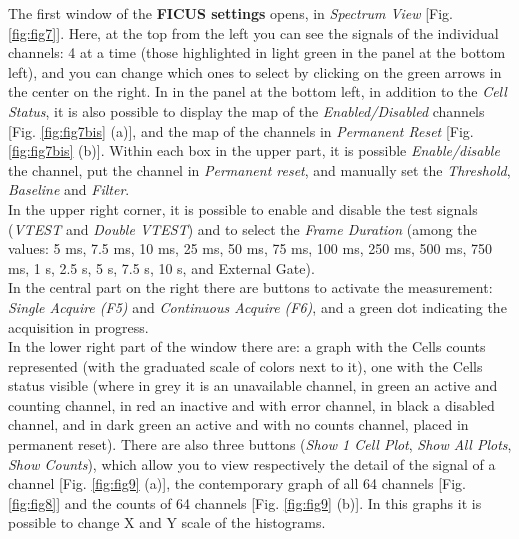 \documentclass[a4paper,12pt,oneside,pdflatex,italian,final,twocolumn]{article}
\begin{document}
The first window of the \textbf{FICUS settings} opens, in \textit{Spectrum View} [Fig. \ref{fig:fig7}]. Here, at the top from the left you can see the signals of the individual channels: 4 at a time (those highlighted in light green in the panel at the bottom left), and you can change which ones to select by clicking on the green arrows in the center on the right. In in the panel at the bottom left, in addition to the \textit{Cell Status}, it is also possible to display the map of the \textit{Enabled/Disabled} channels [Fig. \ref{fig:fig7bis} (a)], and the map of the channels in \textit{Permanent Reset} [Fig. \ref{fig:fig7bis} (b)]. Within each box in the upper part, it is possible \textit{Enable/disable} the channel, put the channel in \textit{Permanent reset}, and manually set the \textit{Threshold}, \textit{Baseline} and \textit{Filter}. \\
In the upper right corner, it is possible to enable and disable the test signals (\textit{VTEST} and \textit{Double VTEST}) and to select the \textit{Frame Duration} (among the values: 5 ms, 7.5 ms, 10 ms, 25 ms, 50 ms, 75 ms, 100 ms, 250 ms, 500 ms, 750 ms, 1 s, 2.5 s, 5 s, 7.5 s, 10 s, and External Gate).\\
In the central part on the right there are buttons to activate the measurement: \textit{Single Acquire (F5)} and \textit{Continuous Acquire (F6)}, and a green dot indicating the acquisition in progress. \\
In the lower right part of the window there are: a graph with the Cells counts represented (with the graduated scale of colors next to it), one with the Cells status visible (where in grey it is an unavailable channel, in green an active and counting channel, in red an inactive and with error channel, in black a disabled channel, and in dark green an active and with no counts channel, placed in permanent reset). There are also three buttons (\textit{Show 1 Cell Plot}, \textit{Show All Plots}, \textit{Show Counts}), which allow you to view respectively the detail of the signal of a channel [Fig. \ref{fig:fig9} (a)], the contemporary graph of all 64 channels [Fig. \ref{fig:fig8}] and the counts of 64 channels [Fig. \ref{fig:fig9} (b)]. In this graphs it is possible to change X and Y scale of the histograms.
\end{document}
